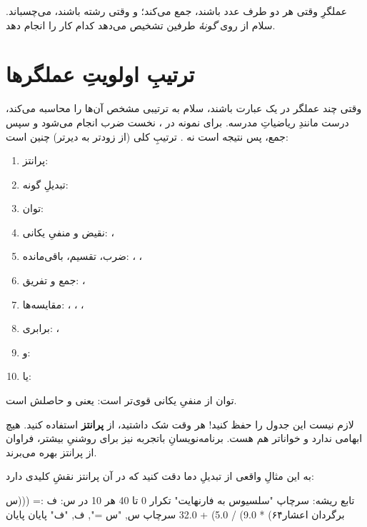 \begin{note}
عملگرِ \code{+} وقتی هر دو طرف عدد باشند، جمع می‌کند؛ و وقتی رشته باشند،
می‌چسباند. سلام از روی \emph{گونهٔ} طرفین تشخیص می‌دهد کدام کار را انجام دهد.
\end{note}

\section{ترتیبِ اولویتِ عملگرها}

وقتی چند عملگر در یک عبارت باشند، سلام به ترتیبی مشخص آن‌ها را محاسبه می‌کند،
درست مانندِ ریاضیاتِ مدرسه. برای نمونه در ، نخست ضرب انجام
می‌شود و سپس جمع، پس نتیجه  است نه . ترتیبِ کلی (از زودتر به
دیرتر) چنین است:

\begin{enumerate}
  \item پرانتز: \code{(\ldots)}
  \item تبدیلِ گونه: 
  \item توان: \code{**}
  \item نقیض و منفیِ یکانی: ، \code{-}
  \item ضرب، تقسیم، باقی‌مانده: \code{*}، \code{/}، \code{\%}
  \item جمع و تفریق: \code{+}، \code{-}
  \item مقایسه‌ها: \code{<}، \code{>}، \code{<=}، \code{>=}
  \item برابری: \code{==}، \code{!=}
  \item و: 
  \item یا: 
\end{enumerate}

توان از منفیِ یکانی قوی‌تر است:  یعنی  و حاصلش  است.

\begin{tip}
لازم نیست این جدول را حفظ کنید! هر وقت شک داشتید، از \textbf{پرانتز} استفاده
کنید.  هیچ ابهامی ندارد و خواناتر هم هست. برنامه‌نویسانِ
باتجربه نیز برای روشنیِ بیشتر، فراوان از پرانتز بهره می‌برند.
\end{tip}

به این مثالِ واقعی از تبدیلِ دما دقت کنید که در آن پرانتز نقشِ کلیدی دارد:

\begin{salamfa}
تابع ریشه:
    سرچاپ "سلسیوس به فارنهایت"
    تکرار 0 تا 40 هر 10 در س:
        ف := (((س برگردان اعشار۶۴) * 9.0) / 5.0) + 32.0
        سرچاپ س, "س =", ف, "ف"
    پایان
پایان
\end{salamfa}

